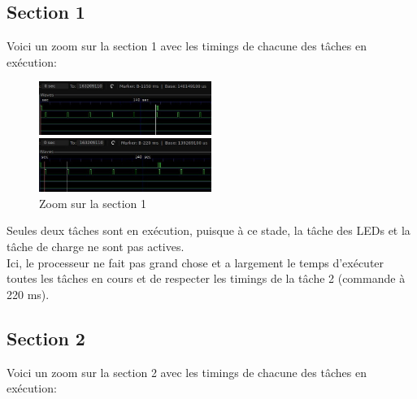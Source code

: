 \documentclass[11pt, a4paper]{article}
\begin{document}
\subsection{Section 1}

Voici un zoom sur la section 1 avec les timings de chacune des tâches en exécution:

\begin{figure}[H]
    \begin{multicols}{2}
        \begin{center}
            \includegraphics[width=0.5\textwidth]{section1_empty_t1_light}
        \end{center}
        \columnbreak
        \begin{center}
            \includegraphics[width=0.5\textwidth]{section1_empty_t2_cmd}
        \end{center}
    \end{multicols}
    \caption{Zoom sur la section 1}
    \label{Zoom sur la section 1}
\end{figure}

Seules deux tâches sont en exécution, puisque à ce stade, la tâche des LEDs et la tâche de charge ne sont pas actives. \\

Ici, le processeur ne fait pas grand chose et a largement le temps d'exécuter toutes les tâches en cours et
de respecter les timings de la tâche 2 (commande à 220 ms).

\subsection{Section 2}

Voici un zoom sur la section 2 avec les timings de chacune des tâches en exécution:
\end{document}
